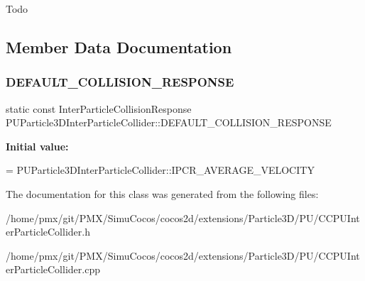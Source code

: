 Todo 

\subsection{Member Data Documentation}
\mbox{\label{classPUParticle3DInterParticleCollider_a500ec69855f80d3bc3c8587c5cc4053f}} 
\subsubsection{\texorpdfstring{D\+E\+F\+A\+U\+L\+T\+\_\+\+C\+O\+L\+L\+I\+S\+I\+O\+N\+\_\+\+R\+E\+S\+P\+O\+N\+SE}{DEFAULT\_COLLISION\_RESPONSE}}
{\footnotesize\ttfamily static const Inter\+Particle\+Collision\+Response P\+U\+Particle3\+D\+Inter\+Particle\+Collider\+::\+D\+E\+F\+A\+U\+L\+T\+\_\+\+C\+O\+L\+L\+I\+S\+I\+O\+N\+\_\+\+R\+E\+S\+P\+O\+N\+SE\hspace{0.3cm}{\ttfamily [static]}}

{\bfseries Initial value\+:}
\begin{DoxyCode}
= 
         PUParticle3DInterParticleCollider::IPCR\_AVERAGE\_VELOCITY
\end{DoxyCode}


The documentation for this class was generated from the following files\+:\begin{DoxyCompactItemize}
\item 
/home/pmx/git/\+P\+M\+X/\+Simu\+Cocos/cocos2d/extensions/\+Particle3\+D/\+P\+U/C\+C\+P\+U\+Inter\+Particle\+Collider.\+h\item 
/home/pmx/git/\+P\+M\+X/\+Simu\+Cocos/cocos2d/extensions/\+Particle3\+D/\+P\+U/C\+C\+P\+U\+Inter\+Particle\+Collider.\+cpp\end{DoxyCompactItemize}
